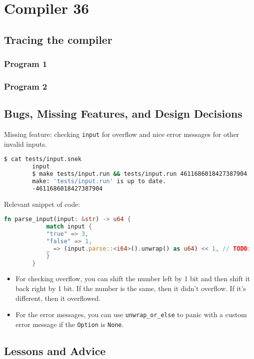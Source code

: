 	\chapter*{Compiler 36}

	\section{Tracing the compiler}

	\subsection{Program 1}

	\subsection{Program 2}

	\section{Bugs, Missing Features, and Design Decisions}

	Missing feature: checking \verb|input| for overflow and nice error messages for other invalid inputs.

	\begin{lstlisting}[language=bash, numbers=none]
		$ cat tests/input.snek
		input
		$ make tests/input.run && tests/input.run 4611686018427387904
		make: 'tests/input.run' is up to date.
		-4611686018427387904
	\end{lstlisting}

	Relevant snippet of code:

	\begin{lstlisting}[language=Rust, title=\texttt{runtime/start.rs}]
		fn parse_input(input: &str) -> u64 {
		    match input {
			"true" => 3,
			"false" => 1,
			_ => (input.parse::<i64>().unwrap() as u64) << 1, // TODO: check for overflow
		    }
		}
	\end{lstlisting}

	\begin{itemize}
		\item For checking overflow, you can shift the number left by 1 bit and then shift it back right by 1 bit. If the number is the same, then it didn't overflow. If it's different, then it overflowed.

		\item For the error messages, you can use \verb|unwrap_or_else| to panic with a custom error message if the \verb|Option| is \verb|None|.
	\end{itemize}

	\section{Lessons and Advice}


